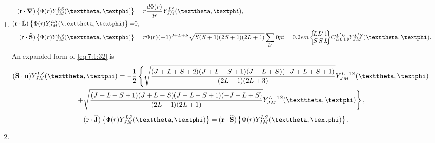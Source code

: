 \begin{enumerate}[label=(\alph*)]
\begin{multline}
\widehat{S}_{\mu}\left\{\Phi(r) Y_{J M}^{L S}(\vartheta, \varphi)\right\}=\Phi(r) \widehat{S}_{\mu}\left\{Y_{J M}^{L S}(\vartheta, \varphi)\right\} \\
=(-1)^{L+1} \Phi(r) \sqrt{(2 J+1) S(S+1)(2 S+1)} \sum_{J^{\prime}}(-1)^{J^{\prime}+S}
\sixj{J}{J'}{1}{S}{S}{L} \clebsch{J}{M}{1}{\mu}{J^{\prime}}{M+\mu} Y_{J^{\prime} M+\mu}^{L S}(\vartheta, \varphi)  \label{eq:7:1:28}
\end{multline}
\begin{equation}
\widehat{J}_{\mu}\left\{\Phi(r) Y_{J M}^{L S}(\vartheta, \varphi)\right\}=\Phi(r) \widehat{J}_{\mu}\left\{Y_{J M}^{L S}(\vartheta, \varphi)\right\}=\Phi(r) \sqrt{J(J+1)} \clebsch{J}{M}{1}{\mu}{J}{M+\mu} Y_{J M+\mu}^{L S}(\vartheta, \varphi). \label{eq:7:1:29}
\end{equation}
\item
\begin{align}
(\vect{r}\cdot \boldsymbol{\nabla})\left\{\Phi(r) Y_{J M}^{L S}(\vartheta, \varphi)\right\}&=r \frac{d \Phi(r)}{d r} Y_{J M}^{L S}(\vartheta, \varphi), \label{eq:7:1:30}\\
(\vect{r} \cdot \hat{\vect{L}})\left\{\Phi(r) Y_{J M}^{L S}(\vartheta, \varphi)\right\}=&0, \label{eq:7:1:31}\\
(\vect{r} \cdot \widehat{\vect{S}})\left\{\Phi(r) Y_{J M}^{L S}(\vartheta, \varphi)\right\}&=r \Phi(r)(-1)^{J+L+S} \sqrt{S(S+1)(2 S+1)(2 L+1)} \sum_{L^{\prime}}
\sixj{L}{L'}{1}{S}{S}{L} \clebsch{L}{0}{1}{0}{L^{\prime}}{0} Y_{J M}^{L^{\prime} S}(\vartheta, \varphi). \label{eq:7:1:32}
\end{align}
An expanded form of \eqref{eq:7:1:32} is
\begin{multline}
(\widehat{\vect{S}} \cdot \vect{n}) Y_{J M}^{L S}(\vartheta, \varphi)=-\frac{1}{2}\left\{\sqrt{\frac{(J+L+S+2)(J+L-S+1)(J-L+S)(-J+L+S+1)}{(2 L+1)(2 L+3)}} Y_{J M}^{L+1 S}(\vartheta, \varphi)\right. \\
\left.+\sqrt{\frac{(J+L+S+1)(J+L-S)(J-L+S+1)(-J+L+S)}{(2 L-1)(2 L+1)}} Y_{J M}^{L-1 S}(\vartheta, \varphi)\right\}, \label{eq:7:1:33}
\end{multline}
\begin{equation}
(\vect{r} \cdot \widehat{\vect{J}})\left\{\Phi(r) Y_{J M}^{L S}(\vartheta, \varphi)\right\}=(\vect{r} \cdot \widehat{\vect{S}})\left\{\Phi(r) Y_{J M}^{L S}(\vartheta, \varphi)\right\}. \label{eq:7:1:34}
\end{equation}
\item
\begin{multline}

\end{multline}
\end{enumerate}
